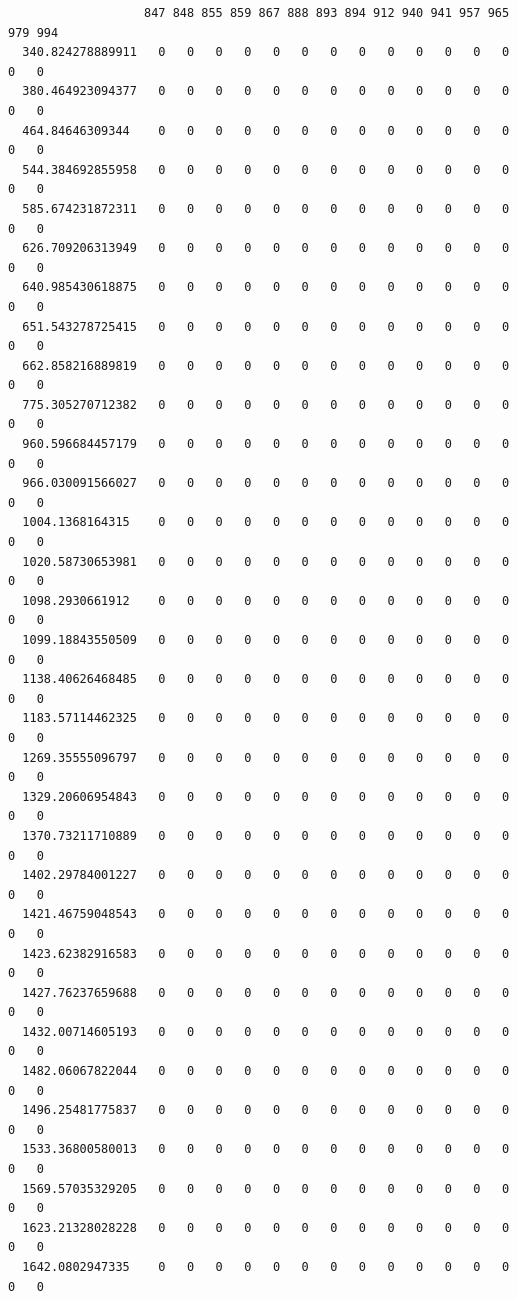 \documentclass[
  letterpaper,
  DIV=11,
  numbers=noendperiod]{scrartcl}
\begin{document}
\begin{verbatim}
                   847 848 855 859 867 888 893 894 912 940 941 957 965 979 994
  340.824278889911   0   0   0   0   0   0   0   0   0   0   0   0   0   0   0
  380.464923094377   0   0   0   0   0   0   0   0   0   0   0   0   0   0   0
  464.84646309344    0   0   0   0   0   0   0   0   0   0   0   0   0   0   0
  544.384692855958   0   0   0   0   0   0   0   0   0   0   0   0   0   0   0
  585.674231872311   0   0   0   0   0   0   0   0   0   0   0   0   0   0   0
  626.709206313949   0   0   0   0   0   0   0   0   0   0   0   0   0   0   0
  640.985430618875   0   0   0   0   0   0   0   0   0   0   0   0   0   0   0
  651.543278725415   0   0   0   0   0   0   0   0   0   0   0   0   0   0   0
  662.858216889819   0   0   0   0   0   0   0   0   0   0   0   0   0   0   0
  775.305270712382   0   0   0   0   0   0   0   0   0   0   0   0   0   0   0
  960.596684457179   0   0   0   0   0   0   0   0   0   0   0   0   0   0   0
  966.030091566027   0   0   0   0   0   0   0   0   0   0   0   0   0   0   0
  1004.1368164315    0   0   0   0   0   0   0   0   0   0   0   0   0   0   0
  1020.58730653981   0   0   0   0   0   0   0   0   0   0   0   0   0   0   0
  1098.2930661912    0   0   0   0   0   0   0   0   0   0   0   0   0   0   0
  1099.18843550509   0   0   0   0   0   0   0   0   0   0   0   0   0   0   0
  1138.40626468485   0   0   0   0   0   0   0   0   0   0   0   0   0   0   0
  1183.57114462325   0   0   0   0   0   0   0   0   0   0   0   0   0   0   0
  1269.35555096797   0   0   0   0   0   0   0   0   0   0   0   0   0   0   0
  1329.20606954843   0   0   0   0   0   0   0   0   0   0   0   0   0   0   0
  1370.73211710889   0   0   0   0   0   0   0   0   0   0   0   0   0   0   0
  1402.29784001227   0   0   0   0   0   0   0   0   0   0   0   0   0   0   0
  1421.46759048543   0   0   0   0   0   0   0   0   0   0   0   0   0   0   0
  1423.62382916583   0   0   0   0   0   0   0   0   0   0   0   0   0   0   0
  1427.76237659688   0   0   0   0   0   0   0   0   0   0   0   0   0   0   0
  1432.00714605193   0   0   0   0   0   0   0   0   0   0   0   0   0   0   0
  1482.06067822044   0   0   0   0   0   0   0   0   0   0   0   0   0   0   0
  1496.25481775837   0   0   0   0   0   0   0   0   0   0   0   0   0   0   0
  1533.36800580013   0   0   0   0   0   0   0   0   0   0   0   0   0   0   0
  1569.57035329205   0   0   0   0   0   0   0   0   0   0   0   0   0   0   0
  1623.21328028228   0   0   0   0   0   0   0   0   0   0   0   0   0   0   0
  1642.0802947335    0   0   0   0   0   0   0   0   0   0   0   0   0   0   0

\end{verbatim}
\end{document}
